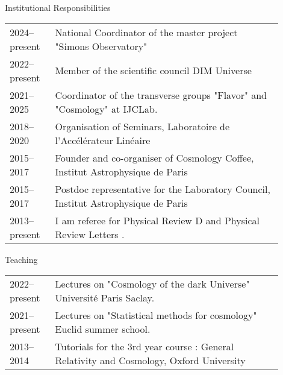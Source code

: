 \documentclass{resume} %
\begin{document}
\vspace{-0.4cm}


\begin{rSection}{Institutional Responsibilities}
\begin{table}[h]
{\def\arraystretch{1.5}\tabcolsep=0pt
\begin{tabular}{p{0.15\linewidth}p{0.75\linewidth}}
2024--present &   National Coordinator of the master project "Simons Observatory"   \\
2022--present &   Member of the scientific council DIM Universe  \\
2021--2025 &  Coordinator of the transverse groups "Flavor" and "Cosmology" at IJCLab. \\
2018--2020 &  Organisation of Seminars, Laboratoire de l'Accélérateur Linéaire  \\
2015--2017 &  Founder and co-organiser of Cosmology Coffee, Institut Astrophysique de Paris  \\
2015--2017 &  Postdoc representative for the Laboratory Council, Institut Astrophysique de Paris \\
2013--present &  I am referee for Physical Review D and Physical Review Letters .  
\end{tabular}%
}
\end{table}
\end{rSection}

\newpage

\vspace{-0.6cm}

\begin{rSection}{Teaching}
\begin{table}[h]
{\def\arraystretch{1.5}\tabcolsep=0pt
\begin{tabular}{p{0.15\linewidth}p{0.75\linewidth}}
2022--present &   Lectures on "Cosmology of the dark Universe"  Université Paris Saclay. \\
2021--present &   Lectures on "Statistical methods for cosmology"  Euclid summer school. \\
2013--2014 &  Tutorials for the 3rd year course : General Relativity and Cosmology, Oxford University 
\end{tabular}%
}
\end{table}
\end{rSection}
\vspace{-0.6cm}
\end{document}
